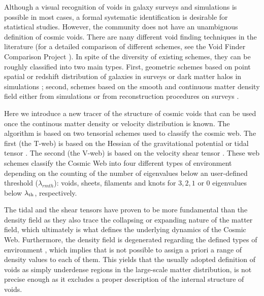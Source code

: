 \documentclass[a4,useAMS,usenatbib,usegraphicx]{latex/mn2e}
\begin{document}
Although a visual recognition of voids in galaxy surveys and simulations
is possible in most cases, a formal systematic identification is desirable
for statistical studies. 
However, the community does not have an unambiguous definition of cosmic
voids. 
There are nany different void finding techniques in the literature
(for a detailed comparison of different schemes,  see the Void Finder
Comparison Project \citet{Colberg08}). 
In spite of the diversity of existing schemes, they can be roughly
classified into two main types. First, geometric schemes based on
point spatial or redshift  distribution of galaxies in surveys or dark
matter halos in  simulations \citep{Kauffmann91, Muller00,
  Gottlober03, Hoyle04, Brunino07,  Foster09, Micheletti14, Sutter14};
second, schemes based on the smooth  and continuous matter density
field either from simulations or from  reconstruction procedures on
surveys \citep{Plionis02, Colberg05,  Shandarin06, Platen07,
  Neyrinck08, MunozCuartas11, Neyrinck13, Ricciardelli2013}.


Here we introduce a new tracer of the structure of cosmic voids that
can be used once the continous matter density or velocity distribution
is known. 
The algorithm is based on two tensorial schemes used to classify the
cosmic web. 
The first (the T-web) is based on the Hessian of the gravitational potential or
tidal tensor \citep{Hahn07, Forero09}. 
The second (the V-web) is based on the velocity shear tensor
\citep{Hoffman12}. 
These web schemes classify the Cosmic Web into four different types of
environment depending on the counting of the number of eigenvalues below an 
user-defined threshold ($\lambda_{rm th}$): voids, sheets, filaments and
knots for $3,2,1$ or $0$ eigenvalues below $\lambda_{\rm th}$, respectively.


The tidal and the shear tensors have proven to be more fundamental than 
the density field as they also trace the collapsing or expanding nature of 
the matter field, which ultimately is what defines the underlying dynamics 
of the Cosmic Web. Furthermore, the density field is degenerated regarding 
the defined types of environment \citep{Hahn07}, which implies that is not 
possible to assign a priori a range of density values to each of them. 
This yields that the usually adopted definition of voids as simply 
underdense regions in the large-scale matter distribution, is not precise 
enough as it excludes a proper description of the internal structure of 
voids.
\end{document}
